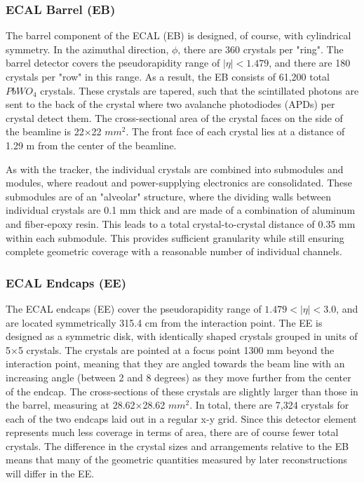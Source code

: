 \documentclass[12pt]{ucsddissertation}
\begin{document}
\subsubsection{ECAL Barrel (EB)}
The barrel component of the ECAL (EB) is designed, of course, with cylindrical symmetry. In the azimuthal direction, $\phi$, there are 360 crystals per "ring". The barrel detector covers the pseudorapidity range of $|\eta| < 1.479$, and there are 180 crystals per "row" in this range. As a result, the EB consists of 61,200 total $PbWO_{4}$ crystals. These crystals are tapered, such that the scintillated photons are sent to the back of the crystal where two avalanche photodiodes (APDs) per crystal detect them. The cross-sectional area of the crystal faces on the side of the beamline is 22$\times$22 $mm^{2}$. The front face of each crystal lies at a distance of 1.29 m from the center of the beamline. 

As with the tracker, the individual crystals are combined into submodules and modules, where readout and power-supplying electronics are consolidated. These submodules are of an "alveolar" structure, where the dividing walls between individual crystals are 0.1 mm thick and are made of a combination of aluminum and fiber-epoxy resin. This leads to a total crystal-to-crystal distance of 0.35 mm within each submodule. This provides sufficient granularity while still ensuring complete geometric coverage with a reasonable number of individual channels. 
\subsubsection{ECAL Endcaps (EE)}
The ECAL endcaps (EE) cover the pseudorapidity range of $ 1.479 < |\eta| < 3.0$, and are located symmetrically 315.4 cm from the interaction point. The EE is designed as a symmetric disk, with identically shaped crystals grouped in units of 5$\times$5 crystals. The crystals are pointed at a focus point 1300 mm beyond the interaction point, meaning that they are angled towards the beam line with an increasing angle (between 2 and 8 degrees) as they move further from the center of the endcap. The cross-sections of these crystals are slightly larger than those in the barrel, measuring at 28.62$\times$28.62 $mm^2$. In total, there are 7,324 crystals for each of the two endcaps laid out in a regular x-y grid. Since this detector element represents much less coverage in terms of area, there are of course fewer total crystals. The difference in the crystal sizes and arrangements relative to the EB means that many of the geometric quantities measured by later reconstructions will differ in the EE.  
\end{document}
